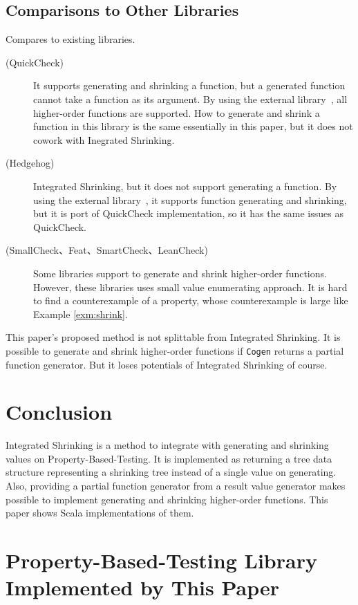\documentclass[a4paper,10pt]{article}
\theoremstyle{definition}
\begin{document}
\subsection{Comparisons to Other Libraries}

Compares to existing libraries.

\begin{description}
  \item[(QuickCheck\cite{claessen_quickcheck_2011})]
    It supports generating and shrinking a function, but a generated function cannot take a function as its argument.
    By using the external library~\cite{quickcheck-higherorder_online}, all higher-order functions are supported.
    How to generate and shrink a function in this library is the same essentially in this paper, but it does not cowork with Inegrated Shrinking.
  \item[(Hedgehog\cite{hedgehog_online})]
    Integrated Shrinking, but it does not support generating a function.
    By using the external library~\cite{hedgehog-fn_online}, it supports function generating and shrinking,
    but it is port of QuickCheck implementation, so it has the same issues as QuickCheck.
  \item[(SmallCheck\cite{runciman_smallcheck_2008}、Feat\cite{duregaard_feat_2012}、SmartCheck\cite{pike_smartcheck_2014}、LeanCheck\cite{matela_braquehais_tools_2017})]
    Some libraries support to generate and shrink higher-order functions.
    However, these libraries uses small value enumerating approach.
    It is hard to find a counterexample of a property, whose counterexample is large like Example \ref{exm:shrink}.
\end{description}

This paper's proposed method is not splittable from Integrated Shrinking.
It is possible to generate and shrink higher-order functions if \texttt{Cogen} returns a partial function generator.
But it loses potentials of Integrated Shrinking of course.

\section{Conclusion}

Integrated Shrinking is a method to integrate with generating and shrinking values on Property-Based-Testing.
It is implemented as returning a tree data structure representing a shrinking tree instead of a single value on generating.
Also, providing a partial function generator from a result value generator makes possible to implement generating and shrinking higher-order functions.
This paper shows Scala implementations of them.



\appendix

\section{Property-Based-Testing Library Implemented by This Paper}\label{sec:appndix-1}

\inputminted[breaklines]{scala}{../src/main/scala/minicheck.scala}
\end{document}
